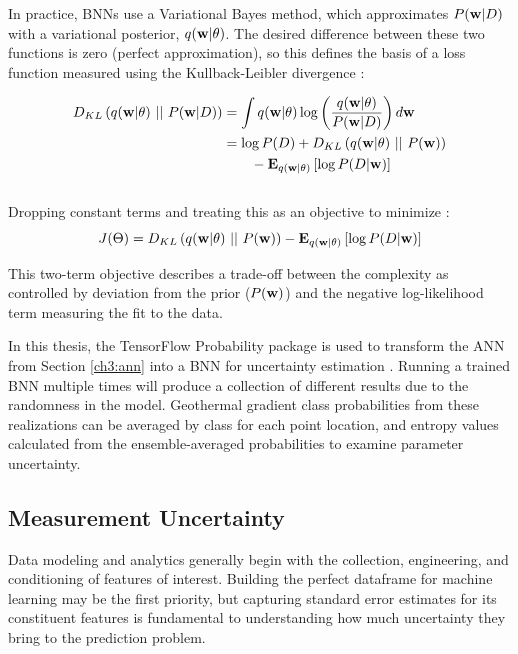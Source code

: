 In practice, BNNs use a Variational Bayes method, which approximates $P({\bf w} \vert D)$ with a variational posterior, $q({\bf w} \vert \theta)$. The desired difference between these two functions is zero (perfect approximation), so this defines the basis of a loss function measured using the Kullback-Leibler divergence \citep{webster_probabilistic_2021}:

\begin{equation}
    \label{eq:bnn_loss}
    \begin{aligned}
    D_{KL}\left(q({\bf w} \vert \theta)\ \vert\vert\ P({\bf w} \vert D)\right) &= \int{q({\bf w} \vert \theta) \log \left({\frac{q({\bf w} \vert \theta)}{P({\bf w} \vert D)}}\right) d{\bf w}} \\
    &= \log P(D) + D_{KL}\left(q({\bf w} \vert \theta)\ \vert\vert\ P({\bf w})\right) \\ 
    &\qquad- \mathbf{E}_{q({\bf w} \vert \theta)}\left[\log P(D \vert {\bf w})\right]
    \end{aligned}
\end{equation}
\\
Dropping constant terms and treating this as an objective to minimize \citep{blundell_weight_2015}:
\begin{equation}
    \label{eq:bnn_objective}
    J(\Theta) = D_{KL}\left(q({\bf w} \vert \theta)\ \vert\vert\ P({\bf w})\right) - \mathbf{E}_{q({\bf w} \vert \theta)}\left[\log P(D \vert {\bf w})\right]
\end{equation}

This two-term objective describes a trade-off between the complexity as controlled by deviation from the prior ($P({\bf w})$) and the negative log-likelihood term measuring the fit to the data.

In this thesis, the TensorFlow Probability package is used to transform the ANN from Section \ref{ch3:ann} into a BNN for uncertainty estimation \citep{dillon_tensorflow_2017}. Running a trained BNN multiple times will produce a collection of different results due to the randomness in the model. Geothermal gradient class probabilities from these realizations can be averaged by class for each point location, and entropy values calculated from the ensemble-averaged probabilities to examine parameter uncertainty.

\subsection{Measurement Uncertainty}\label{ch3:measure_uncertainty}
Data modeling and analytics generally begin with the collection, engineering, and conditioning of features of interest. Building the perfect dataframe for machine learning may be the first priority, but capturing standard error estimates for its constituent features is fundamental to understanding how much uncertainty they bring to the prediction problem.

